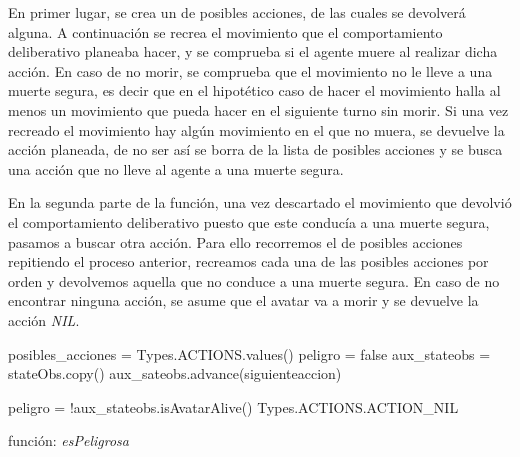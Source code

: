 \documentclass[size=a4, parskip=half, titlepage=false, toc=flat, toc=bib, 12pt]{scrartcl}
\begin{document}
En primer lugar, se crea un  de posibles acciones, de las cuales
se devolverá alguna. A continuación se recrea el movimiento que el comportamiento
deliberativo planeaba hacer, y se comprueba si el agente muere al realizar dicha acción.
En caso de no morir, se comprueba que el movimiento no le lleve a una muerte segura,
es decir que en el hipotético caso de hacer el movimiento halla al menos un movimiento que
pueda hacer en el siguiente turno sin morir. Si una vez recreado el movimiento hay algún
movimiento en el que no muera, se devuelve la acción planeada, de no ser así se borra de
la lista de posibles acciones y se busca una acción que no lleve al agente a una muerte segura.

En la segunda parte de la función, una vez descartado el movimiento que devolvió el comportamiento
deliberativo puesto que este conducía a una muerte segura, pasamos a buscar otra acción. Para ello
recorremos el  de posibles acciones repitiendo el proceso anterior, recreamos cada una
de las posibles acciones por orden y devolvemos aquella que no conduce a una muerte segura. En caso
de no encontrar ninguna acción, se asume que el avatar va a morir y se devuelve la acción \textit{NIL}.

\begin{algorithm}[H]
 posibles\_acciones = Types.ACTIONS.values()\;
 peligro = false\;
 aux\_stateobs = stateObs.copy()\;
 aux\_sateobs.advance(siguienteaccion)\;

 peligro = !aux\_stateobs.isAvatarAlive()\;
 \Return Types.ACTIONS.ACTION\_NIL\;
 \caption{función: \textit{esPeligrosa}}
\end{algorithm}
\end{document}
